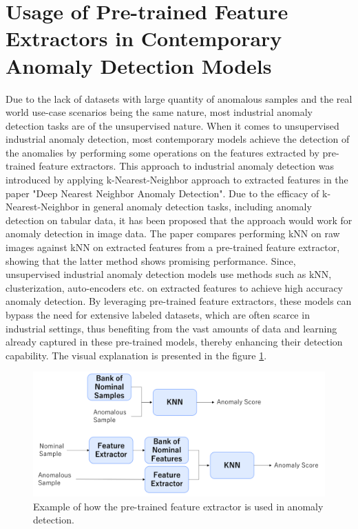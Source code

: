 \section{Usage of Pre-trained Feature Extractors in Contemporary Anomaly Detection Models}
Due to the lack of datasets with large quantity of anomalous samples\cite{mvtecad}\cite{realnet} and the real world use-case scenarios being the same nature, most industrial anomaly detection tasks are of the unsupervised nature. When it comes to unsupervised industrial anomaly detection, most contemporary models achieve the detection of the anomalies by performing some operations on the features extracted by pre-trained feature extractors\cite{pre_trained_iad}\cite{uiad_survey}. This approach to industrial anomaly detection was introduced by applying k-Nearest-Neighbor approach to extracted features in the paper "Deep Nearest Neighbor Anomaly Detection"\cite{bergman2020deepnearestneighboranomaly}. Due to the efficacy of k-Nearest-Neighbor in general anomaly detection tasks, including anomaly detection on tabular data, it has been proposed that the approach would work for anomaly detection in image data. The paper compares performing kNN on raw images against kNN on extracted features from a pre-trained feature extractor, showing that the latter method shows promising performance\cite{bergman2020deepnearestneighboranomaly}. Since, unsupervised industrial anomaly detection models use methods such as kNN\cite{patchcore}\cite{bergman2020deepnearestneighboranomaly}, clusterization\cite{patchcore}, auto-encoders\cite{realnet} etc. on extracted features to achieve high accuracy anomaly detection. By leveraging pre-trained feature extractors\cite{pre_trained_iad}, these models can bypass the need for extensive labeled datasets, which are often scarce in industrial settings, thus benefiting from the vast amounts of data and learning already captured in these pre-trained models, thereby enhancing their detection capability. The visual explanation is presented in the figure \ref{fig:feature_extractor_usage}.

\begin{figure}[t]
	\begin{center}
		\includegraphics[width=1.0\linewidth]{Chapter_3/feature_extractor_usage.png}
	\end{center}
	\caption{Example of how the pre-trained feature extractor is used in anomaly detection.\cite{bergman2020deepnearestneighboranomaly}}
	\label{fig:feature_extractor_usage}
\end{figure} 	


